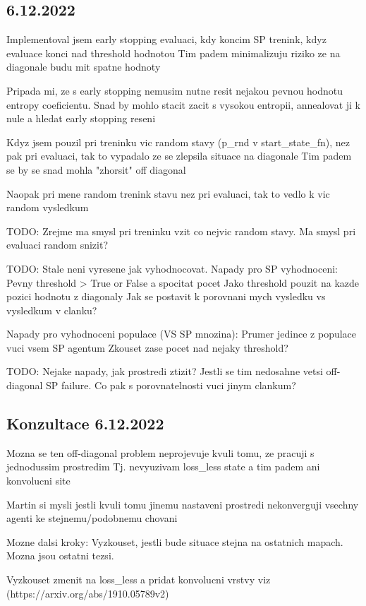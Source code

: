 \documentclass{report}
\begin{document}
\subsection*{6.12.2022}
\begin{list}{}{}
    \item Implementoval jsem early stopping evaluaci, kdy koncim SP trenink, kdyz evaluace konci nad threshold hodnotou
        Tim padem minimalizuju riziko ze na diagonale budu mit spatne hodnoty
    \item Pripada mi, ze s early stopping nemusim nutne resit nejakou pevnou hodnotu entropy coeficientu.
        Snad by mohlo stacit zacit s vysokou entropii, annealovat ji k nule a hledat early stopping reseni
    \item Kdyz jsem pouzil pri treninku vic random stavy (p\_rnd v start\_state\_fn), nez pak pri evaluaci, tak to vypadalo ze se zlepsila situace na diagonale
        Tim padem se by se snad mohla "zhorsit" off diagonal
    \item Naopak pri mene random trenink stavu nez pri evaluaci, tak to vedlo k vic random vysledkum
    \item TODO: Zrejme ma smysl pri treninku vzit co nejvic random stavy. Ma smysl pri evaluaci random snizit?
    \item TODO: Stale neni vyresene jak vyhodnocovat. 
        Napady pro SP vyhodnoceni: 
            Pevny threshold > True or False a spocitat pocet
            Jako threshold pouzit na kazde pozici hodnotu z diagonaly  
            Jak se postavit k porovnani mych vysledku vs vysledkum v clanku?

        Napady pro vyhodnoceni populace (VS SP mnozina):
            Prumer jedince z populace vuci vsem SP agentum
            Zkouset zase pocet nad nejaky threshold?

    \item TODO: Nejake napady, jak prostredi ztizit? Jestli se tim nedosahne vetsi off-diagonal SP failure.
        Co pak s porovnatelnosti vuci jinym clankum?

\end{list}

\subsection*{Konzultace 6.12.2022}
\begin{list}{}{}
    \item Mozna se ten off-diagonal problem neprojevuje kvuli tomu, ze pracuji s jednodussim prostredim
        Tj. nevyuzivam loss\_less state a tim padem ani konvolucni site
    \item Martin si mysli jestli kvuli tomu jinemu nastaveni prostredi nekonverguji vsechny agenti ke stejnemu/podobnemu chovani
    \item Mozne dalsi kroky: Vyzkouset, jestli bude situace stejna na ostatnich mapach. Mozna jsou ostatni tezsi.
    \item Vyzkouset zmenit na loss\_less a pridat konvolucni vrstvy viz (https://arxiv.org/abs/1910.05789v2)



\end{list}
\end{document}
